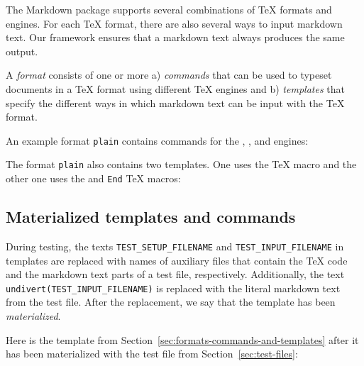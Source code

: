 \documentclass[final]{ltugboat}
\begin{document}
The Markdown package supports several combinations of \TeX{} formats and engines. For each \TeX{} format, there are also several ways to input markdown text. Our framework ensures that a markdown text always produces the same output.

A \emph{format} consists of one or more a) \emph{commands} that can be used to typeset documents in a \TeX{} format using different \TeX{} engines and b) \emph{templates} that specify the different ways in which markdown text can be input with the \TeX{} format.

An example format \texttt{plain} contains commands for the , , and  engines:

\smallskip
\noindent
\addtocounter{footnote}{1}%
%

\smallskip
\noindent
The format \texttt{plain} also contains two templates. One uses the  \TeX{} macro and the other one uses the  and \texttt{End} \TeX{} macros:

\smallskip
\noindent
{}

\smallskip
\exampleSeparator

\smallskip
\noindent
{}

\subsection{Materialized templates and commands}
\label{sec:materialized-templates-and-commands}

During testing, the texts \texttt{TEST\_SETUP\_FILENAME} and \texttt{TEST\_INPUT\_FILENAME} in templates are replaced with names of auxiliary files that contain the \TeX{} code and the markdown text parts of a test file, respectively. Additionally, the text {\small\texttt{undivert(TEST\_INPUT\_FILENAME)}} is replaced with the literal markdown text from the test file. After the replacement, we say that the template has been \emph{materialized}.

Here is the template  from Section~\ref{sec:formats-commands-and-templates} after it has been materialized with the test file  from Section~\ref{sec:test-files}:
\end{document}
